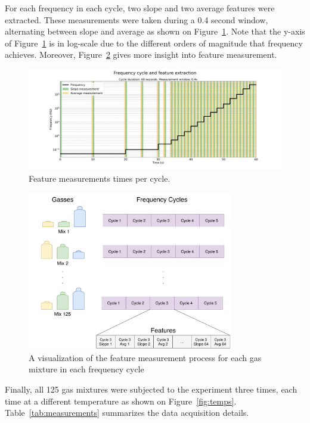 For each frequency in each cycle, two slope and two average features were extracted. These measurements were taken during a 0.4 second window, alternating between slope and average as shown on Figure~\ref{fig:feat-window}. Note that the y-axis of Figure~\ref{fig:feat-window} is in log-scale due to the different orders of magnitude that frequency achieves. Moreover, Figure~\ref{fig:experiment} gives more insight into feature measurement.

\begin{figure}[!htb]
	\centering
	\includegraphics[width=1\textwidth]{../figures/measurement-windows.png}
	
	\caption{Feature measurements times per cycle.}
	\label{fig:feat-window}
\end{figure} 

\begin{figure}[h]
	\centering
	\includegraphics[width=0.8\textwidth]{../figures/features.pdf}
	\caption{A visualization of the feature measurement process for each gas mixture in each frequency cycle}
	\label{fig:experiment}
\end{figure}

Finally, all 125 gas mixtures were subjected to the experiment three times, each time at a different temperature as shown on Figure~\ref{fig:temps}. Table~\ref{tab:measurements} summarizes the data acquisition details.

